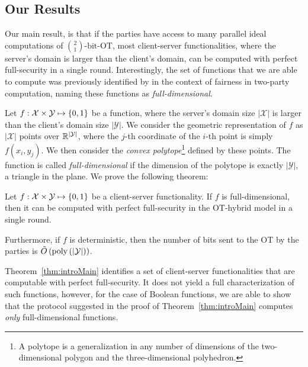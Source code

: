 \documentclass{llncs}
\newcommand{\bOT}[2]{\binom{#2}{#1}\text{-bit-OT}}
\newcommand{\X}{\mathcal{X}}
\newcommand{\Y}{\mathcal{Y}}
\begin{document}
\subsection{Our Results}\label{sec:results}
Our main result, is that if the parties have access to many parallel ideal computations of $\bOT12$, most client-server functionalities, where the server's domain is larger than the client's domain, can be computed with perfect full-security in a single round. Interestingly, the set of functions that we are able to compute was previously identified by \citet{Ash14} in the context of fairness in two-party computation, naming these functions as \emph{full-dimensional}. 

Let $f : \X \times \Y \mapsto \zo$ be a function, where the server's domain size $|\X|$ is larger than the client's domain size $|\Y|$. We consider the geometric representation of $f$ as $|\X|$ points over $\R^{|\Y|}$, where the $j$-th coordinate of the $i$-th
point is simply $f(x_i, y_j)$. We then consider the \emph{convex polytope}\footnote{A polytope is a generalization in any number of dimensions of the two-dimensional polygon and the three-dimensional polyhedron.} defined by these points. The function is called \emph{full-dimensional} if the dimension of the polytope is exactly $|\Y|$, \eg a triangle in the plane.  We prove the following theorem:

\begin{theorem}[Informal]\label{thm:introMain}
	Let $f:\X \times \Y \mapsto \zo$ be a client-server functionality. If $f$ is full-dimensional, then it can be computed with perfect full-security in the OT-hybrid model in a single round. 
    
    Furthermore, if $f$ is deterministic, then the number of bits sent to the OT by the parties is $\tilde{O}\of{\poly\of{|\Y|}}$.
\end{theorem}

Theorem~\ref{thm:introMain} identifies a set of client-server functionalities that are computable with perfect full-security. It does not yield a full characterization of such functions, however, for the case of Boolean functions, we are able to show that the protocol suggested in the proof of Theorem~\ref{thm:introMain} computes \emph{only} full-dimensional functions.

\end{document}
